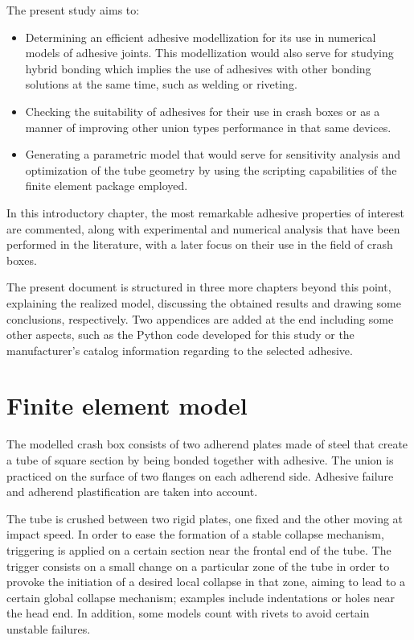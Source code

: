 \documentclass[cmfonts]{witpress}
\begin{document}
The present study aims to:

\begin{itemize}
	\item Determining an efficient adhesive modellization for its use in numerical models of adhesive joints. This modellization would also serve for studying hybrid bonding which implies the use of adhesives with other bonding solutions at the same time, such as welding or riveting.

	\item Checking the suitability of adhesives for their use in crash boxes or as a manner of improving other union types performance in that same devices.

	\item Generating a parametric model that would serve for sensitivity analysis and  optimization of the tube geometry by using the scripting capabilities of the finite element package employed.
\end{itemize}

In this introductory chapter, the most remarkable adhesive properties of interest are commented, along with experimental and numerical analysis that have been performed in the literature, with a later focus on their use in the field of crash boxes.

The present document is structured in three more chapters beyond this point, explaining the realized model, discussing the obtained results and drawing some conclusions, respectively. Two appendices are added at the end including some other aspects, such as the Python code developed for this study or the manufacturer's catalog information regarding to the selected adhesive.

\section{Finite element model}
The modelled crash box consists of two adherend plates made of steel that create a tube of square section by being bonded together with adhesive. The union is practiced on the surface of two flanges on each adherend side. Adhesive failure and adherend plastification are taken into account.

The tube is crushed between two rigid plates, one fixed and the other moving at impact speed. In order to ease the formation of a stable collapse mechanism, triggering is applied on a certain section near the frontal end of the tube. The trigger consists on a small change on a particular zone of the tube in order to provoke the initiation of a desired local collapse in that zone, aiming to lead to a certain global collapse mechanism; examples include indentations or holes near the head end. In addition, some models count with rivets to avoid certain unstable failures.
\end{document}
